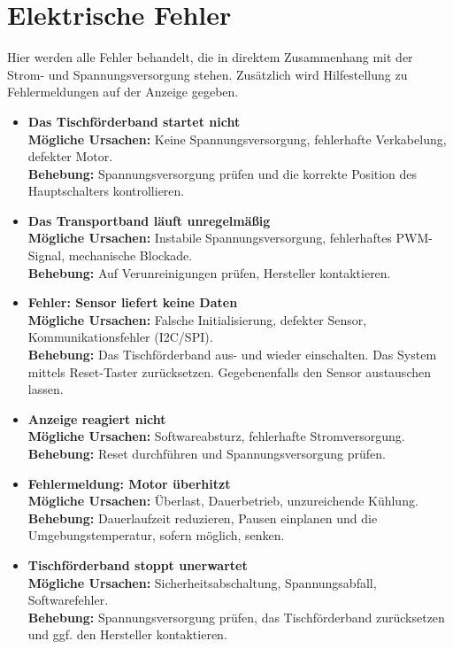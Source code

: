 \section{Elektrische Fehler}
Hier werden alle Fehler behandelt, die in direktem Zusammenhang mit der Strom- und Spannungsversorgung stehen. Zusätzlich wird Hilfestellung zu Fehlermeldungen auf der Anzeige gegeben.

\begin{itemize}
	\item \textbf{Das Tischförderband startet nicht} \\
	\textbf{Mögliche Ursachen:} Keine Spannungsversorgung, fehlerhafte Verkabelung, defekter Motor. \\
	\textbf{Behebung:} Spannungsversorgung prüfen und die korrekte Position des Hauptschalters kontrollieren.
	
	\item \textbf{Das Transportband läuft unregelmäßig} \\
	\textbf{Mögliche Ursachen:} Instabile Spannungsversorgung, fehlerhaftes PWM-Signal, mechanische Blockade. \\
	\textbf{Behebung:} Auf Verunreinigungen prüfen, Hersteller kontaktieren. 
	
	\item \textbf{Fehler: \glqq Sensor liefert keine Daten\grqq} \\
	\textbf{Mögliche Ursachen:} Falsche Initialisierung, defekter Sensor, Kommunikationsfehler (I2C/SPI). \\
	\textbf{Behebung:} Das Tischförderband aus- und wieder einschalten. Das System mittels Reset-Taster zurücksetzen. Gegebenenfalls den Sensor austauschen lassen. 
	
	\item \textbf{Anzeige reagiert nicht} \\
	\textbf{Mögliche Ursachen:} Softwareabsturz, fehlerhafte Stromversorgung. \\
	\textbf{Behebung:} Reset durchführen und Spannungsversorgung prüfen.
	
	\item \textbf{Fehlermeldung: \glqq Motor überhitzt\grqq} \\
	\textbf{Mögliche Ursachen:} Überlast, Dauerbetrieb, unzureichende Kühlung. \\
	\textbf{Behebung:} Dauerlaufzeit reduzieren, Pausen einplanen und die Umgebungstemperatur, sofern möglich, senken. 
	
	\item \textbf{Tischförderband stoppt unerwartet} \\
	\textbf{Mögliche Ursachen:} Sicherheitsabschaltung, Spannungsabfall, Softwarefehler. \\
	\textbf{Behebung:} Spannungsversorgung prüfen, das Tischförderband zurücksetzen und ggf. den Hersteller kontaktieren.
	

\end{itemize}
